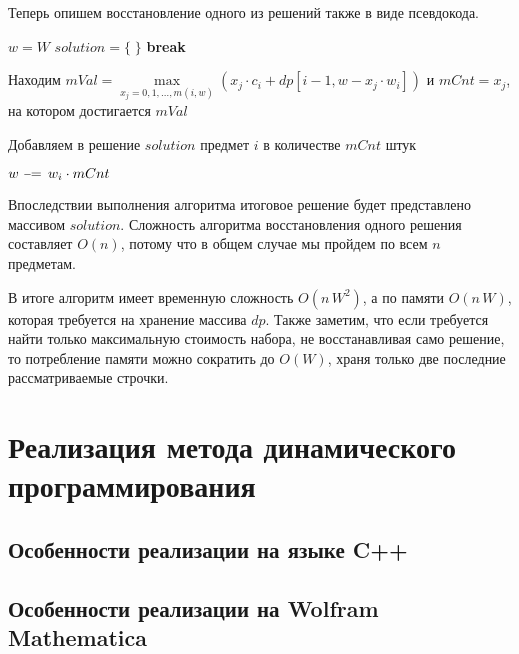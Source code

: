 \documentclass[12pt, a4paper]{article}
\newcommand{\algorithmicbreak}{\textbf{break}}
\newcommand{\Break}{\State \algorithmicbreak}
\begin{document}

Теперь опишем восстановление одного из решений также в виде псевдокода.
\begin{algorithmic}[1]
	\State $w = W$
	\State $solution = \{\;\}$
			\Break
		\EndIf
		\State \parbox[t]{\dimexpr12cm-\algorithmicindent}{Находим $mVal = \max\limits_{x_j = 0,1,\dots, m(i,w)} \left(x_j\cdot c_i + dp[i-1, w - x_j\cdot w_i]\right)$ и $mCnt = x_j$, на котором достигается $mVal$}
		\If{$mCnt \ne 0$}
			\State \parbox[t]{\dimexpr11.5cm-\algorithmicindent}{Добавляем в решение $solution$ предмет $i$ в количестве $mCnt$ штук}
			\State $w\,\,\scalebox{0.75}[1.0]{\(-\)}\!\!=\, w_i \cdot mCnt$
		\EndIf
	\EndFor
\end{algorithmic}

Впоследствии выполнения алгоритма итоговое решение будет представлено массивом $solution$. Сложность алгоритма восстановления одного решения составляет $O(n)$, потому что в общем случае мы пройдем по всем $n$ предметам.

В итоге алгоритм имеет временную сложность $O(n\,W^2)$, а по памяти $O(n\,W)$, которая требуется на хранение массива $dp$. Также заметим, что если требуется найти только максимальную стоимость набора, не восстанавливая само решение, то потребление памяти можно сократить до $O(W)$, храня только две последние рассматриваемые строчки.

\section{Реализация метода динамического программирования}

\subsection{Особенности реализации на языке C++}


\subsection{Особенности реализации на Wolfram Mathematica}

\end{document}
